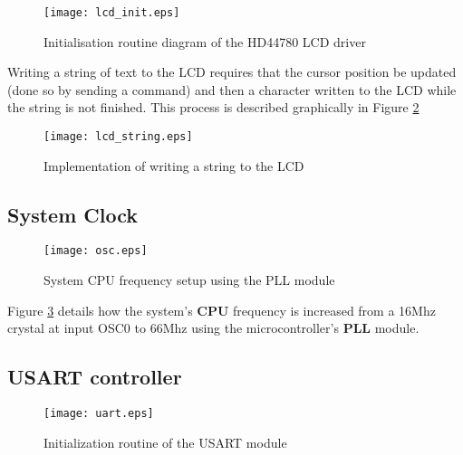 \documentclass[11pt, a4paper, oneside]{Thesis} %
\begin{document}
\begin{figure}[h]
  \begin{center}
    \texttt{[image: lcd\_init.eps]}
  \end{center}
  \caption{Initialisation routine diagram of the HD44780 LCD driver}
  \label{fig:lcd_init}
\end{figure}

Writing a string of text to the LCD requires that the cursor position be updated (done so by sending a command) and then a character written to the LCD while the string is not finished. This process is described graphically in Figure \ref{fig:lcd_string}

\begin{figure}[h]
  \begin{center}
    \texttt{[image: lcd\_string.eps]}
  \end{center}
  \caption{Implementation of writing a string to the LCD}
  \label{fig:lcd_string}
\end{figure}

\subsection{System Clock}

\begin{figure}[h]
  \begin{center}
    \texttt{[image: osc.eps]}
  \end{center}
  \caption{System CPU frequency setup using the PLL module}
  \label{fig:osc_setup}
\end{figure}

Figure \ref{fig:osc_setup} details how the system's \textbf{CPU} frequency is increased from a 16Mhz crystal at input OSC0 to 66Mhz using the microcontroller's \textbf{PLL} module. 

\subsection{USART controller}

\begin{figure}[h]
  \begin{center}
    \texttt{[image: uart.eps]}
  \end{center}
  \caption{Initialization routine of the USART module}
  \label{fig:uart_setup}
\end{figure}
\end{document}
